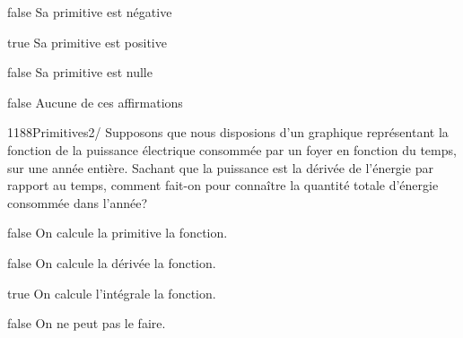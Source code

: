             \begin{reponses}
                \item[false] Sa primitive est négative
                \item[true] Sa primitive est positive
                \item[false] Sa primitive est nulle
                \item[false] Aucune de ces affirmations
            \end{reponses}
            \begin{question}{1188}{Primitives}{2}{/}
                Supposons que nous disposions d'un graphique représentant la fonction de la puissance électrique consommée par un foyer en fonction du temps, sur une année entière. Sachant que la puissance est la dérivée de l'énergie par rapport au temps, comment fait-on pour connaître la quantité totale d'énergie consommée dans l'année?
            \end{question}
            \begin{reponses}
                \item[false] On calcule la primitive la fonction.
                \item[false] On calcule la dérivée la fonction.
                \item[true] On calcule l'intégrale la fonction.
                \item[false] On ne peut pas le faire.
            \end{reponses}
